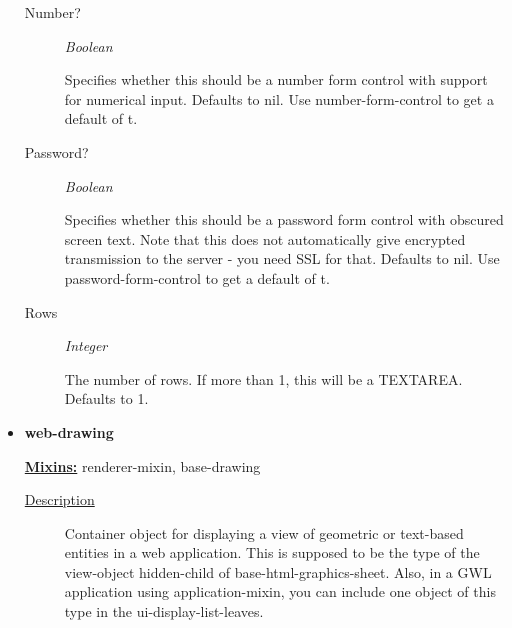 \documentclass [11pt]{book}
\begin{document}
\begin{itemize}
\begin{description}
\item [Number?]
\emph{Boolean}

 Specifies whether this should be a number form control with support for numerical input.
Defaults to nil. Use number-form-control to get a default of t.




\item [Password?]
\emph{Boolean}

 Specifies whether this should be a password form control with obscured screen text.
Note that this does not automatically give encrypted transmission to the server - you need SSL
for that. Defaults to nil. Use password-form-control to get a default of t.




\item [Rows]
\emph{Integer}

 The number of rows. If more than 1, this will be a TEXTAREA. Defaults to 1.




\end{description}







\item {}
\label{prim:web-drawing}
\textbf{web-drawing}


\textbf{
\underline{Mixins:}} renderer-mixin, base-drawing





\begin{description}

\item [
\underline{Description}]


Container object for displaying a view of geometric 
or text-based entities in a web application. This is supposed to be the type of the
view-object hidden-child of base-html-graphics-sheet. Also, in a GWL application using 
application-mixin, you can include one object of this type in the ui-display-list-leaves.




\end{description}




\begin{figure}
\begin{lrbox}{\boxedverb}
\begin{minipage}{\linewidth}
{\small

}
\end{minipage}
\end{lrbox}
\end{figure}
\end{itemize}
\end{document}
